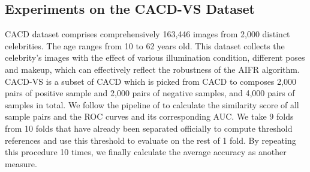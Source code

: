 \documentclass[runningheads]{llncs}
\begin{document}


\subsection{Experiments on the CACD-VS Dataset}
CACD dataset comprises comprehensively 163,446 images from 2,000 distinct celebrities. The age ranges from 10 to 62 years old. This dataset collects the celebrity's images with the effect of various illumination condition, different poses and makeup, which can effectively reflect the robustness of the AIFR algorithm. CACD-VS is a subset of CACD which is picked from CACD to composes 2,000 pairs of positive sample and 2,000 pairs of negative samples, and 4,000 pairs of samples in total. We follow the pipeline of \cite{cacd} to calculate the similarity score of all sample pairs and the ROC curves and its corresponding AUC. We take 9 folds from 10 folds that have already been separated officially to compute threshold references and use this threshold to evaluate on the rest of 1 fold. By repeating this procedure 10 times, we finally calculate the average accuracy as another measure.
\end{document}
